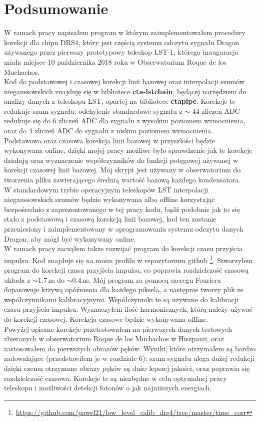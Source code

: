 \documentclass[a4paper,11pt,twoside]{article}
\begin{document}
\section{Podsumowanie}
W ramach pracy napisałem program w którym zaimplementowałem procedury korekcji dla chipu DRS4, który jest częścią systemu odczytu sygnału Dragon używanego przez pierwszy prototypowy teleskop LST-1, którego inauguracja miała miejsce 10 października 2018 roku w Obserwatorium Roque de los Muchachos.\\
Kod do podstawowej i czasowej korekcji linii bazowej oraz interpolacji szumów niegaussowskich znajduję się w bibliotece {\bf{cta-lstchain}}, będącej narzędziem do analizy danych z teleskopu LST, opartej na bibliotece {\bf{ctapipe}}. Korekcje te redukuje szum sygnału: odchylenie standardowe sygnału z $\sim$ 44 zliczeń ADC redukuje się do 6 zliczeń ADC dla sygnału z wysokim poziomem wzmocnienia, oraz do 4 zliczeń ADC do sygnału z niskim poziomem wzmocnienia. \\ Podstawowa oraz czasowa korekcja linii bazowej w przyszłości będzie wykonywana online, dzięki mojej pracy możliwe było sprawdzenie jak te korekcje działają oraz wyznaczenie współczynników do funkcji potęgowej używanej w korekcji czasowej linii bazowej.  Mój skrypt jest używany w obserwatorium do tworzenia pliku  zawierającego średnią wartość bazową każdego kondensatora. \\
W standardowym trybie operacyjnym teleskopów LST interpolacji niegaussowskich szumów będzie wykonywana albo offline korzystając bezpośrednio z zaprezentowanego w tej pracy kodu, bądź podobnie jak to się stało z podstawową i czasową korekcją linii bazowej, kod ten zostanie przeniesiony i zaimplementowany w oprogramowaniu systemu odczytu danych Dragon, aby mógł być wykonywany online. \\
W ramach pracy zacząłem także rozwijać program do korekcji czasu przyjścia impulsu. Kod znajduje się na moim profilu w repozytorium github \footnote{\url{https://github.com/pawel21/low_level_calib_drs4/tree/master/time_corr}}. Stworzyłem program do korekcji czasu przyjścia impulsu, co poprawia rozdzielczość czasową układa z $\sim$1.7\,ns do $\sim$0.4\,ns. Mój program za pomocą szeregu Fouriera dopasowuje krzywą opóźnienia dla każdego piksela, a następnie tworzy plik ze współczynnikami kalibracyjnymi. Współczynniki te są używane do kalibracji czasu przyjścia impulsu. Wyznaczyłem ilość harmonicznych, którą należy używać do korekcji czasowej. Korekcja czasowe będzie wykonywana offline.\\
Powyżej opisane korekcje przetestowałem na pierwszych danych testowych zbieranych w obserwatorium Roque de los Muchachos w Hiszpanii, oraz zastosowałem do pierwszych obrazów pęków.  
Wyniki, które otrzymałem są bardzo zadowalające (przedstawiłem je w rozdziale 6): szum sygnału ulega dużej redukcji dzięki czemu otrzymane obrazy pęków są dużo lepszej jakości, oraz poprawia się rozdzielczość czasowa. 
Korekcje te są niezbędne w celu optymalnej pracy teleskopu i możliwości detekcji fotonów o jak najniższych energiach. 
\end{document}
